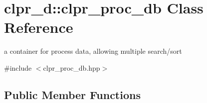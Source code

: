 \hypertarget{classclpr__d_1_1clpr__proc__db}{\section{clpr\-\_\-d\-:\-:clpr\-\_\-proc\-\_\-db \-Class \-Reference}
\label{classclpr__d_1_1clpr__proc__db}
}


a container for process data, allowing multiple search/sort  




{\ttfamily \#include $<$clpr\-\_\-proc\-\_\-db.\-hpp$>$}

\subsection*{\-Public \-Member \-Functions}
